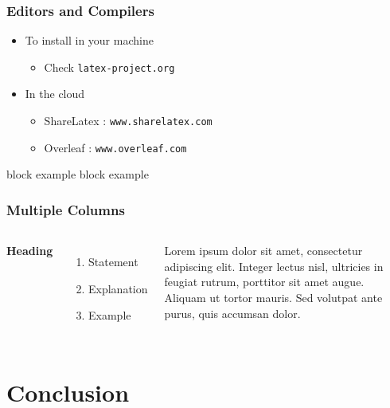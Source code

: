 \documentclass{beamer}
\begin{document}
\begin{frame}
\frametitle{Editors and Compilers}
\begin{itemize}
\item To install in your machine
\begin{itemize}
\item Check \texttt{latex-project.org}
\end{itemize}
\item In the cloud
\begin{itemize}
\item ShareLatex : \texttt{www.sharelatex.com}
\item Overleaf : \texttt{www.overleaf.com}
\end{itemize}
\end{itemize}
\vskip 1cm
\begin{block}{block example}
block example
\end{block}
\end{frame}


\begin{frame}
\frametitle{Multiple Columns}
\begin{columns}[c]
\textbf{Heading}
\begin{enumerate}
\item Statement
\item Explanation
\item Example
\end{enumerate}
Lorem ipsum dolor sit amet, consectetur adipiscing elit. Integer lectus nisl, ultricies in feugiat rutrum, porttitor sit amet augue. Aliquam ut tortor mauris. Sed volutpat ante purus, quis accumsan dolor.
\end{columns}
\end{frame}



\section{Conclusion}
\end{document}
